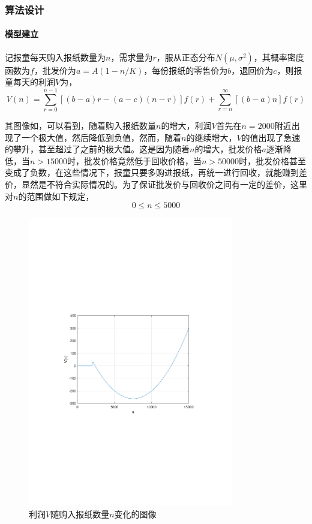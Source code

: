 \subsubsection{算法设计}

\paragraph{模型建立} 记报童每天购入报纸数量为$n$，需求量为$r$，服从正态分布$N(\mu, \sigma^2)$，其概率密度函数为$f$，批发价为$a=A(1-n/K)$，每份报纸的零售价为$b$，退回价为$c$，则报童每天的利润$V$为，
\begin{equation}\label{eq:ex7_profit}
    V(n)=\sum_{r=0}^{n-1}[(b-a) r-(a-c)(n-r)] f(r)+\sum_{r=n}^{\infty}[(b-a) n] f(r)
\end{equation}

其图像如，可以看到，随着购入报纸数量$n$的增大，利润$V$首先在$n=2000$附近出现了一个极大值，然后降低到负值，然而，随着$n$的继续增大，$V$的值出现了急速的攀升，甚至超过了之前的极大值。这是因为随着$n$的增大，批发价格$a$逐渐降低，当$n>15000$时，批发价格竟然低于回收价格，当$n>50000$时，批发价格甚至变成了负数，在这些情况下，报童只要多购进报纸，再统一进行回收，就能赚到差价，显然是不符合实际情况的。为了保证批发价与回收价之间有一定的差价，这里对$n$的范围做如下规定，
\begin{equation}
    0 \le n \le 5000
\end{equation}

\begin{figure}[H]
    \centering
    \includegraphics[width=0.8\textwidth,trim={3.09cm 9.295cm 3.09cm 9.295cm},clip]{fig/ex7_profit.pdf}
    \caption{利润$V$随购入报纸数量$n$变化的图像}
    \label{fig:ex7_profit}
\end{figure}

